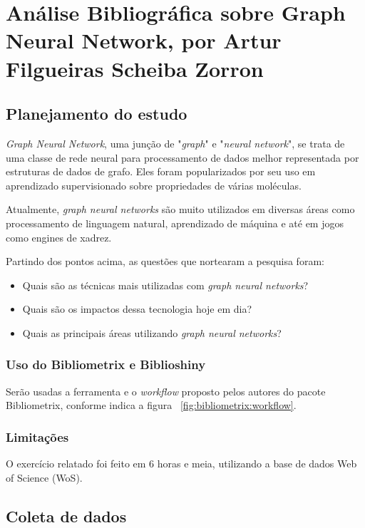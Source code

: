 \chapter{Análise Bibliográfica sobre Graph Neural Network, por Artur Filgueiras Scheiba Zorron\label{chap:bibliometria:tucazorron}}

\section{Planejamento do estudo}

\textit{Graph Neural Network}, uma junção de "\textit{graph}" e "\textit{neural network}", se trata de uma classe de rede neural para processamento de dados melhor representada por estruturas de dados de grafo. Eles foram popularizados por seu uso em aprendizado supervisionado sobre propriedades de várias moléculas.

Atualmente, \textit{graph neural networks} são muito utilizados em diversas áreas como processamento de linguagem natural, aprendizado de máquina e até em jogos como engines de xadrez.

Partindo dos pontos acima, as questões que nortearam a pesquisa foram:
\begin{itemize}
    \item Quais são as técnicas mais utilizadas com \textit{graph neural networks}?
    \item Quais são os impactos dessa tecnologia hoje em dia?
    \item Quais as principais áreas utilizando \textit{graph neural networks}?
\end{itemize}

\subsection{Uso do Bibliometrix e Biblioshiny}
Serão usadas a ferramenta e o \textit{workflow} proposto pelos autores do pacote Bibliometrix, conforme indica a figura ~\ref{fig:bibliometrix:workflow}.

\subsection{Limitações} O exercício relatado foi feito em 6 horas e meia, utilizando a base de dados Web of Science (WoS).

\section{Coleta de dados\label{MASSA:coleta}}


